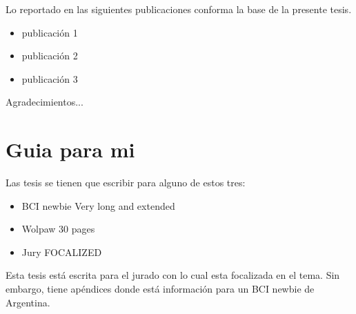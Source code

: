 \documentclass[11pt,twoside,openright]{moddalthesis}
\theoremstyle{definition}
\begin{document}

\begin{listofpubs}
Lo reportado en las siguientes publicaciones conforma la base de la
presente tesis.

\begin{itemize}
\item publicación 1
\item publicación 2
\item publicación 3
\end{itemize}
\end{listofpubs}


\begin{acknowledgements}
Agradecimientos...
\end{acknowledgements}





\listoftables
{}

\listoffigures
{}


\afterpreface
\linespread{1.5}



\chapter*{Guia para mi}

Las tesis se tienen que escribir para alguno de estos tres:

\begin{itemize}
\item BCI newbie   Very long and extended
\item Wolpaw    30 pages
\item Jury   FOCALIZED
\end{itemize}

Esta tesis está escrita para el jurado con lo cual esta focalizada en el tema.  Sin embargo, tiene apéndices donde está información para un BCI newbie de Argentina.
\end{document}
